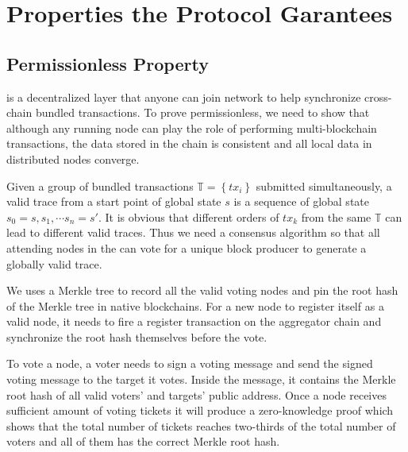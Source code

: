 \section {Properties the Protocol Garantees}
\label{chp:properities}



\subsection{Permissionless Property}
\dprotocol is a decentralized layer that anyone can join network to help synchronize cross-chain bundled transactions. To prove permissionless, we need to show that although any running node can play the role of performing multi-blockchain transactions, the data stored in the chain is consistent and all local data in distributed nodes converge.

Given a group of bundled transactions $\mathbb{T} = \left\{tx_i\right\}$ submitted simultaneously, a valid trace from a start point of global state $s$ is a sequence of global state $s_0=s, s_1, \cdots s_n = s'$. It is obvious that different orders of $tx_k$ from the same $\mathbb{T}$ can lead to different valid traces. Thus we need a consensus algorithm so that all attending nodes in the \dprotocol can vote for a unique block producer to generate a globally valid trace.

We uses a Merkle tree to record all the valid voting nodes and pin the root hash of the Merkle tree in native blockchains. For a new node to register itself as a valid node, it needs to fire a register transaction on the aggregator chain and synchronize the root hash themselves before the vote.

To vote a node, a voter needs to sign a voting message and send the signed voting message to the target it votes. Inside the message, it contains the Merkle root hash of all valid voters' and targets' public address. Once a node receives sufficient amount of voting tickets it will produce a zero-knowledge proof which shows that the total number of tickets reaches two-thirds of the total number of voters and all of them has the correct Merkle root hash. 

